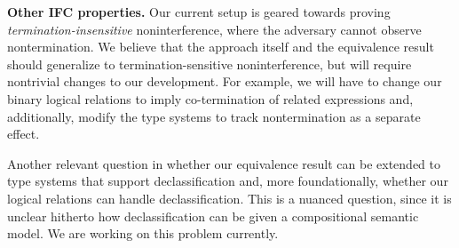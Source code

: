 \medskip
\noindent \textbf{Other IFC properties.}  Our current setup is geared
towards proving \emph{termination-insensitive} noninterference, where
the adversary cannot observe nontermination. We believe that the
approach itself and the equivalence result should generalize to
termination-sensitive noninterference, but will require nontrivial
changes to our development. For example, we will have to change our
binary logical relations to imply co-termination of related
expressions and, additionally, modify the type systems to track
nontermination as a separate effect.

Another relevant question in whether our equivalence result can be
extended to type systems that support declassification and, more
foundationally, whether our logical relations can handle
declassification. This is a nuanced question, since it is unclear
hitherto how declassification can be given a compositional semantic
model. We are working on this problem currently.


